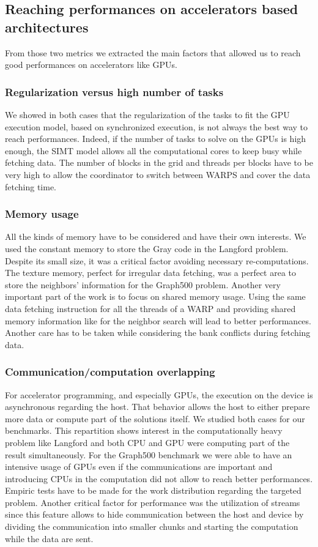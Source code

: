 \subsection{Reaching performances on accelerators based architectures}
From those two metrics we extracted the main factors that allowed us to reach good performances on accelerators like GPUs. 
\subsubsection{Regularization versus high number of tasks}
We showed in both cases that the regularization of the tasks to fit the GPU execution model, based on synchronized execution, is not always the best way to reach performances.
Indeed, if the number of tasks to solve on the GPUs is high enough, the SIMT model allows all the computational cores to keep busy while fetching data. 
The number of blocks in the grid and threads per blocks have to be very high to allow the coordinator to switch between WARPS and cover the data fetching time.
\subsubsection{Memory usage}
All the kinds of memory have to be considered and have their own interests. 
We used the constant memory to store the Gray code in the Langford problem.
Despite its small size, it was a critical factor avoiding necessary re-computations.
The texture memory, perfect for irregular data fetching, was a perfect area to store the neighbors’ information for the Graph500 problem.
Another very important part of the work is to focus on shared memory usage. 
Using the same data fetching instruction for all the threads of a WARP and providing shared memory information like for the neighbor search will lead to better performances. 
Another care has to be taken while considering the bank conflicts during fetching data. 

\subsubsection{Communication/computation overlapping}
For accelerator programming, and especially GPUs, the execution on the device is asynchronous regarding the host. 
That behavior allows the host to either prepare more data or compute part of the solutions itself. 
We studied both cases for our benchmarks. 
This repartition shows interest in the computationally heavy problem like Langford and both CPU and GPU were computing part of the result simultaneously. 
For the Graph500 benchmark we were able to have an intensive usage of GPUs even if the communications are important and introducing CPUs in the computation did not allow to reach better performances.
Empiric tests have to be made for the work distribution regarding the targeted problem. 
Another critical factor for performance was the utilization of streams since this feature allows to hide communication between the host and device by dividing the communication into smaller chunks and starting the computation while the data are sent. 

